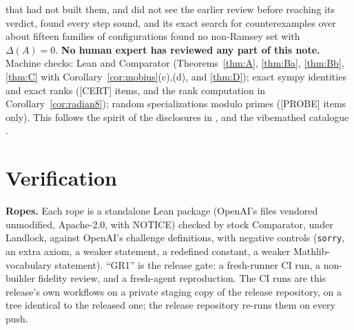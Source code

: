 \documentclass[11pt]{amsart}
\newcommand{\st}[1]{\textsf{[#1]}}
\theoremstyle{plain}
\theoremstyle{definition}
\begin{document}
that had not built them, and did not see the earlier review before reaching its verdict, found every step
sound, and its exact search for counterexamples over about fifteen families of configurations found no
non-Ramsey set with $\Delta(A)=0$. \textbf{No human expert has reviewed any part of this note.} Machine checks:
Lean and Comparator (Theorems~\ref{thm:A}, \ref{thm:Ba}, \ref{thm:Bb}, \ref{thm:C} with
Corollary~\ref{cor:mobius}(c),(d), and \ref{thm:D}); exact sympy identities and exact ranks (\st{CERT}
items, and the rank computation in Corollary~\ref{cor:radian8}); random
specializations modulo primes (\st{PROBE} items only). This follows the spirit of the disclosures in
\cite{Palvolgyi}, \cite{MR} and the vibemathed catalogue \cite{vibemathed}.

\appendix
\section{Verification}\label{app:lean}

\noindent\textbf{Ropes.} Each rope is a standalone Lean package (OpenAI's files vendored unmodified,
Apache-2.0, with NOTICE) checked by stock Comparator, under Landlock, against OpenAI's challenge
definitions, with negative controls (\texttt{sorry}, an extra axiom, a weaker statement, a redefined
constant, a weaker Mathlib-vocabulary statement). ``GR1'' is the release gate: a fresh-runner CI run, a
non-builder fidelity review, and a fresh-agent reproduction. The CI runs are this release's own
workflows on a private staging copy of the release repository, on a tree identical to the released
one; the release repository re-runs them on every push.
\end{document}
